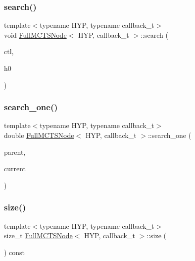 \subsubsection{\texorpdfstring{search()}{search()}}
{\footnotesize\ttfamily template$<$typename H\+YP, typename callback\+\_\+t$>$ \\
void \hyperlink{class_full_m_c_t_s_node}{Full\+M\+C\+T\+S\+Node}$<$ H\+YP, callback\+\_\+t $>$\+::search (\begin{DoxyParamCaption}\item[{\hyperlink{struct_control}{Control}}]{ctl,  }\item[{H\+YP \&}]{h0 }\end{DoxyParamCaption})\hspace{0.3cm}{\ttfamily [inline]}}

\mbox{\label{class_full_m_c_t_s_node_a822ebc234b6c508c7c4cc255f205f8f9}} 
\subsubsection{\texorpdfstring{search\+\_\+one()}{search\_one()}}
{\footnotesize\ttfamily template$<$typename H\+YP, typename callback\+\_\+t$>$ \\
double \hyperlink{class_full_m_c_t_s_node}{Full\+M\+C\+T\+S\+Node}$<$ H\+YP, callback\+\_\+t $>$\+::search\+\_\+one (\begin{DoxyParamCaption}\item[{\hyperlink{class_full_m_c_t_s_node_afcc6a60f2d45fd1d6c4bd5f4998b147d}{this\+\_\+t} $\ast$}]{parent,  }\item[{H\+YP \&}]{current }\end{DoxyParamCaption})\hspace{0.3cm}{\ttfamily [inline]}}

\mbox{\label{class_full_m_c_t_s_node_a57b4b69d2c9dd20ae5bfdee83aec783a}} 
\subsubsection{\texorpdfstring{size()}{size()}}
{\footnotesize\ttfamily template$<$typename H\+YP, typename callback\+\_\+t$>$ \\
size\+\_\+t \hyperlink{class_full_m_c_t_s_node}{Full\+M\+C\+T\+S\+Node}$<$ H\+YP, callback\+\_\+t $>$\+::size (\begin{DoxyParamCaption}{ }\end{DoxyParamCaption}) const\hspace{0.3cm}{\ttfamily [inline]}}




